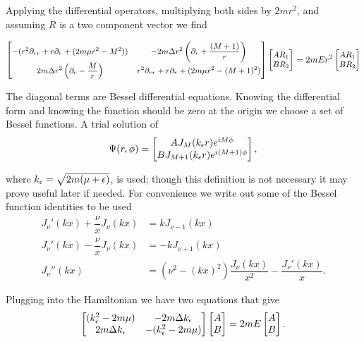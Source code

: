 Applying the differential operators, multiplying both sides by $2mr^2$, and assuming $R$ is a two component vector we find

\begin{equation*}
  \small
  \begin{bmatrix}
    -(r^2\partial_{rr} +r\partial_r +(2m\mu r^2 -M^2)) & -2m\Delta r^2\left(\partial_r + \dfrac{(M+1)}{r}\right) \\
    2m\Delta r^2\left(\partial_r - \dfrac{M}{r}\right) & r^2\partial_{rr} +r\partial_r +(2m\mu r^2 -(M+1)^2)
  \end{bmatrix} 
  \begin{bmatrix}
    AR_1 \\
    BR_2 \\
  \end{bmatrix} 
  = 2mE r^2
  \begin{bmatrix}
    AR_1 \\
    BR_2 \\
  \end{bmatrix} 
\end{equation*}

The diagonal terms are Bessel differential equations.
Knowing the differential form and knowing the function should be zero at the origin we choose a set of Bessel functions.
A trial solution of
\begin{equation}
  \Psi(r,\phi) = 
  \begin{bmatrix}
    A J_M(k_{\epsilon} r) e^{iM\phi} \\
    B J_{M+1}(k_{\epsilon} r) e^{i(M+1)\phi}
  \end{bmatrix},
\end{equation}

where $k_{\epsilon} = \sqrt{2m(\mu + \epsilon)}$, is used; though this definition is not necessary it may prove useful later if needed.
For convenience we write out some of the Bessel function identities to be used
\begin{align*}
  J_{\nu}'(kx) + \dfrac{\nu}{x}J_{\nu}(kx) &= kJ_{\nu-1}(kx) \\
  J_{\nu}'(kx) - \dfrac{\nu}{x}J_{\nu}(kx) &= - kJ_{\nu+1}(kx) \\
  J_{\nu}''(kx) &= (\nu^2 - (kx)^2)\dfrac{J_{\nu}(kx)}{x^2} - \dfrac{J_{\nu}'(kx)}{x}.
\end{align*}

Plugging into the Hamiltonian we have two equations that give
\begin{equation*}
  \begin{bmatrix}
  (k_{\epsilon}^2-2m\mu) & -2m\Delta k_{\epsilon} \\
  2m\Delta k_{\epsilon} & -(k_{\epsilon}^2-2m\mu)
  \end{bmatrix} 
  \begin{bmatrix}
    A \\
    B  
  \end{bmatrix}
  = 2mE
  \begin{bmatrix}
    A \\
    B  
  \end{bmatrix}.
\end{equation*}

